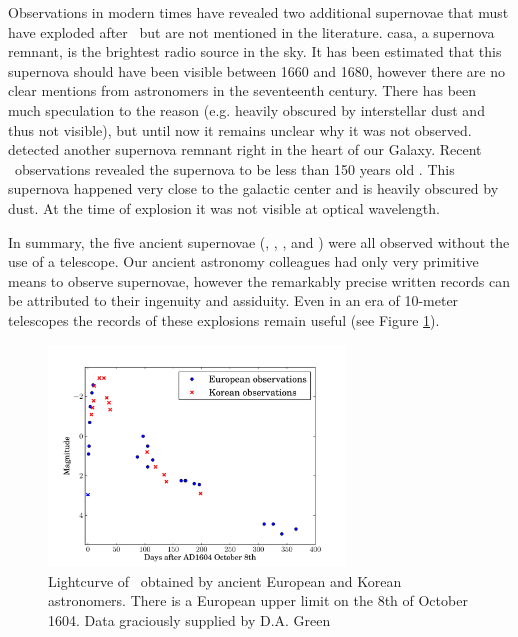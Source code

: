 Observations in modern times have revealed two additional supernovae that must have exploded after \ but are not mentioned in the literature. \gls{casa}, a supernova remnant, is the brightest radio source in the sky. It has been estimated that this supernova should have been visible between 1660 and 1680, however there are no clear mentions from astronomers in the seventeenth century. There has been much speculation to the reason (e.g. heavily obscured by interstellar dust and thus not visible), but until now it remains unclear why it was not observed. \citet{1984Natur.312..527G} detected another supernova remnant right in the heart of our Galaxy. Recent \xray\ observations revealed the supernova to be less than 150 years old \citep{2008ApJ...680L..41R}. This supernova happened very close to the galactic center and is heavily obscured by dust. At the time of explosion it was not visible at optical wavelength. 

In summary, the five ancient supernovae (, , ,  and ) were all observed without the use of a telescope. Our ancient astronomy colleagues had only very primitive means to observe supernovae, however the remarkably precise written records can be attributed to their ingenuity and assiduity. Even in an era of 10-meter telescopes the records of these explosions remain useful (see Figure \ref{fig:sn1604_ancient_lc}).


\begin{figure}[htbp] %
   \centering
   \includegraphics[width=0.7\textwidth]{chapter_intro/plots/sn1604_ancient_lc.pdf} 
   \caption[Lightcurve of SN 1604]{Lightcurve of \ obtained by ancient European and Korean astronomers. There is a European upper limit on the 8th of October 1604. Data graciously supplied by D.A. Green \citep{1977QB841.C58......, 2003LNP...598....7G}}
   \label{fig:sn1604_ancient_lc}
\end{figure}

